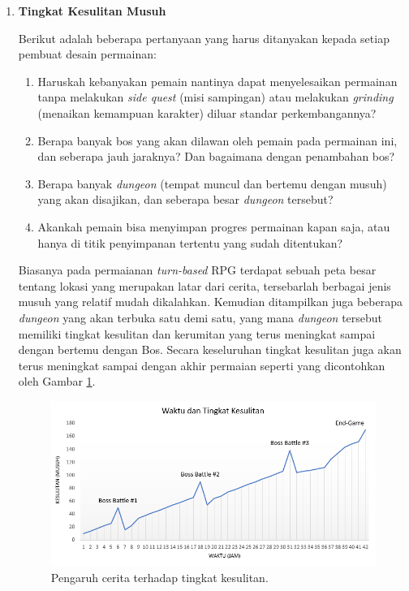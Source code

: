 \begin{subs}
	\begin{enumerate}[label=\textbf{\arabic*).}]
		
		\item \textbf{Tingkat Kesulitan Musuh}
		\setlength{\parindent}{0.8cm}
	
		Berikut adalah beberapa pertanyaan yang harus ditanyakan kepada setiap pembuat desain permainan:
		
		\begin{enumerate}[label=\alph*).]
			\item Haruskah kebanyakan pemain nantinya dapat menyelesaikan permainan tanpa melakukan \textit{side quest} (misi sampingan) atau melakukan \textit{grinding} (menaikan kemampuan karakter) diluar standar perkembangannya?
			\item Berapa banyak bos yang akan dilawan oleh pemain pada permainan ini, dan seberapa jauh jaraknya? Dan bagaimana dengan penambahan bos?
			\item Berapa banyak \textit{dungeon} (tempat muncul dan bertemu dengan musuh) yang akan disajikan, dan seberapa besar \textit{dungeon} tersebut?
			\item Akankah pemain bisa menyimpan progres permainan kapan saja, atau hanya di titik penyimpanan tertentu yang sudah ditentukan?
		\end{enumerate}
		\vspace{1ex}
	
		Biasanya pada permaianan \textit{turn-based} RPG terdapat sebuah peta besar tentang lokasi yang merupakan latar dari cerita, tersebarlah berbagai jenis musuh yang relatif mudah dikalahkan. Kemudian ditampilkan juga beberapa \textit{dungeon} yang akan terbuka satu demi satu, yang mana \textit{dungeon} tersebut memiliki tingkat kesulitan dan kerumitan yang terus meningkat sampai dengan bertemu dengan Bos. Secara keseluruhan tingkat kesulitan juga akan terus meningkat sampai dengan akhir permaian seperti yang dicontohkan oleh Gambar \ref{fig:story_dungeon}.
		
		\begin{figure} [!h] \centering
			\includegraphics[scale=0.68]{img/story_dungeon.png}
			\caption{Pengaruh cerita terhadap tingkat kesulitan.}
			\label{fig:story_dungeon}
		\end{figure}
		

\end{enumerate}
\end{subs}
